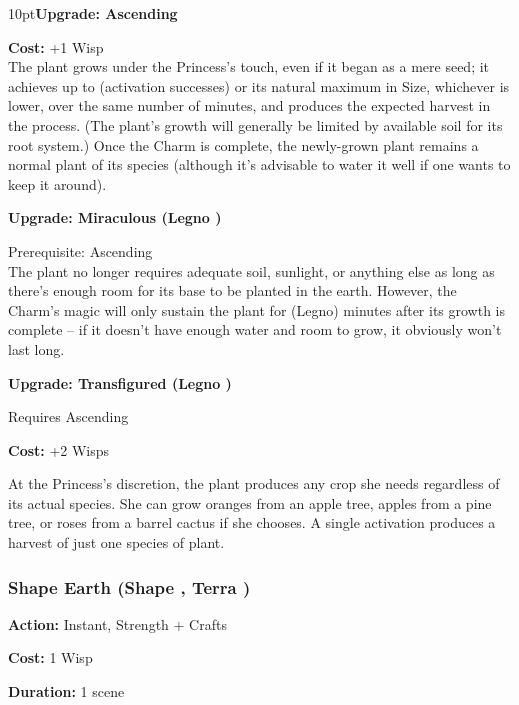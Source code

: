 \begin{myindentpar}{10pt}\textbf{Upgrade: Ascending}

\noindent \textbf{Cost:} +1 Wisp \\

\noindent The plant grows under the Princess's touch, even if it began as a mere seed; it achieves up to (activation successes) or its natural maximum in Size, whichever is lower, over the same number of minutes, and produces the expected harvest in the process. (The plant's growth will generally be limited by available soil for its root system.) Once the Charm is complete, the newly-grown plant remains a normal plant of its species (although it's advisable to water it well if one wants to keep it around).

\textbf{Upgrade: Miraculous (Legno \textbullet\textbullet)}

\noindent Prerequisite: Ascending \\

\noindent The plant no longer requires adequate soil, sunlight, or anything else as long as there's enough room for its base to be planted in the earth. However, the Charm's magic will only sustain the plant for (Legno) minutes after its growth is complete -- if it doesn't have enough water and room to grow, it obviously won't last long.

\textbf{Upgrade: Transfigured (Legno \textbullet\textbullet\textbullet)}

\noindent Requires Ascending

\noindent \textbf{Cost:} +2 Wisps

At the Princess's discretion, the plant produces any crop she needs regardless of its actual species. She can grow oranges from an apple tree, apples from a pine tree, or roses from a barrel cactus if she chooses. A single activation produces a harvest of just one species of plant. 
\end{myindentpar}

\subsubsection*{Shape Earth (Shape \textbullet, Terra \textbullet)}

\noindent \textbf{Action:} Instant, Strength + Crafts

\noindent \textbf{Cost:} 1 Wisp

\noindent \textbf{Duration:} 1 scene \\

